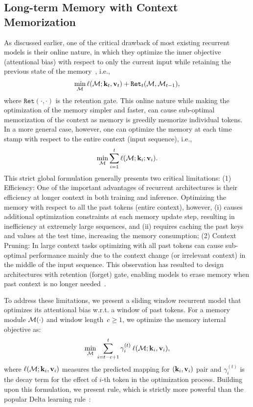 \subsection{Long-term Memory with Context Memorization}\label{sec:omega-rule}
As discussed earlier, one of the critical drawback of most existing recurrent models is their online nature, in which they optimize the inner objective (attentional bias) with respect to only the current input while retaining the previous state of the memory~\citep{behrouz2025Miras, liu2024longhorn}, i.e.,
\begin{align}
    \min_{\mathcal{M}} \ell(\mathcal{M}; \mathbf{k}_t, \mathbf{v}_t) + \texttt{Ret}_t(\mathcal{M}, \mathcal{M}_{t-1}),
\end{align}
where $\texttt{Ret}(\cdot, \cdot)$ is the retention gate. This online nature while making the optimization of the memory simpler and faster, can cause sub-optimal memorization of the context as memory is greedily memorize individual tokens. In a more general case, however, one can optimize the memory at each time stamp with respect to the entire context (input sequence), i.e.,
\begin{align}\label{eq:global-optimization}
     \min_{\mathcal{M}} \sum_{i = 1}^{t} \ell(\mathcal{M}; \mathbf{k}_i; \mathbf{v}_i).
\end{align}
This strict global formulation generally presents two critical limitations: (1) Efficiency: One of the important advantages of recurrent architectures is their efficiency at longer context in both training and inference. Optimizing the memory with respect to all the past tokens (entire context), however, (i) causes additional optimization constraints at each memory update step, resulting in inefficiency at extremely large sequences, and (ii) requires caching the past keys and values at the test time, increasing the memory consumption; (2) Context Pruning: In large context tasks optimizing with all past tokens can cause sub-optimal performance mainly due to the context change (or irrelevant context) in the middle of the input sequence. This observation has resulted to design architectures with retention (forget) gate, enabling models to erase memory when past context is no longer needed~\citep{sun2023retentive, peng2025rwkv7, behrouz2024titans, behrouz2025Miras, yang2024gatedattn}. 


To address these limitations, we present a sliding window recurrent model that optimizes its attentional bias w.r.t. a window of past tokens. For a memory module $\mathcal{M}(\cdot)$ and window length~$c \geq 1$, we optimize the memory internal objective as:
\begin{align}
    \min_{\mathcal{M}} \sum_{i = t - c + 1}^{t} \gamma^{(t)}_i \: \ell(\mathcal{M}; \mathbf{k}_i, \mathbf{v}_i), 
\end{align}
where $\ell(\mathcal{M}; \mathbf{k}_i, \mathbf{v}_i)$  measures the predicted mapping for $(\mathbf{k}_i, \mathbf{v}_i)$ pair and $\gamma^{(t)}_i$ is the decay term for the effect of $i$-th token in the optimization process. Building upon this formulation, 
we present  \learningrule{} rule, which is strictly more powerful than the popular Delta learning rule~\citep{widrow1988adaptive, schlag2021linear}:

